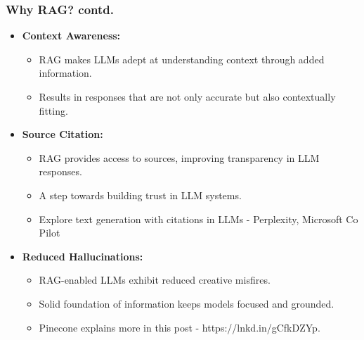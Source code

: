 \begin{frame}[fragile]\frametitle{Why RAG? contd.}

\begin{itemize}
  \item \textbf{Context Awareness:}
    \begin{itemize}
      \item RAG makes LLMs adept at understanding context through added information.
      \item Results in responses that are not only accurate but also contextually fitting.
    \end{itemize}

  \item \textbf{Source Citation:}
    \begin{itemize}
      \item RAG provides access to sources, improving transparency in LLM responses.
      \item A step towards building trust in LLM systems.
      \item Explore text generation with citations in LLMs - Perplexity, Microsoft Co Pilot %
    \end{itemize}

  \item \textbf{Reduced Hallucinations:}
    \begin{itemize}
      \item RAG-enabled LLMs exhibit reduced creative misfires.
      \item Solid foundation of information keeps models focused and grounded.
      \item Pinecone explains more in this post - https://lnkd.in/gCfkDZYp.
    \end{itemize}

\end{itemize}

\end{frame}

